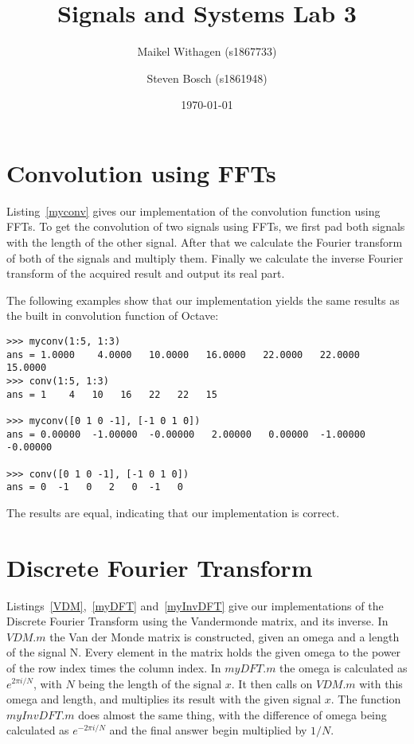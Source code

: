 \documentclass{article}
\title{Signals and Systems Lab 3}
\author{Maikel Withagen (s1867733) \and Steven Bosch (s1861948)}
\date{\today}
\begin{document}
\maketitle

\section{Convolution using FFTs}
Listing~\ref{myconv} gives our implementation of the convolution function using FFTs. To get the convolution of two signals using FFTs, we first pad both signals with the length of the other signal. After that we calculate the Fourier transform of both of the signals and multiply them. Finally we calculate the inverse Fourier transform of the acquired result and output its real part.

The following examples show that our implementation yields the same results as the built in convolution function of Octave:
\begin{lstlisting}
>>> myconv(1:5, 1:3)
ans = 1.0000    4.0000   10.0000   16.0000   22.0000   22.0000   15.0000
>>> conv(1:5, 1:3)
ans = 1    4   10   16   22   22   15

>>> myconv([0 1 0 -1], [-1 0 1 0])
ans = 0.00000  -1.00000  -0.00000   2.00000   0.00000  -1.00000  -0.00000

>>> conv([0 1 0 -1], [-1 0 1 0])
ans = 0  -1   0   2   0  -1   0
\end{lstlisting}
The results are equal, indicating that our implementation is correct.

 

\section{Discrete Fourier Transform}
Listings~\ref{VDM},~\ref{myDFT} and~\ref{myInvDFT} give our implementations of the Discrete Fourier Transform using the Vandermonde matrix, and its inverse. In $VDM.m$ the Van der Monde matrix is constructed, given an omega and a length of the signal N. Every element in the matrix holds the given omega to the power of the row index times the column index. In $myDFT.m$ the omega is calculated as $e^{2\pi i/N}$, with $N$ being the length of the signal $x$. It then calls on $VDM.m$ with this omega and length, and multiplies its result with the given signal $x$. The function $myInvDFT.m$ does almost the same thing, with the difference of omega being calculated as $e^{-2\pi i/N}$ and the final answer begin multiplied by $1/N$.
\end{document}
